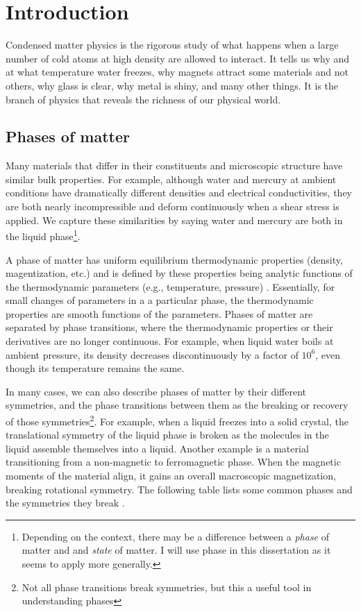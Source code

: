 \chapter{Introduction}
Condensed matter physics is the rigorous study of what happens when a large number of cold atoms at high density are allowed to interact. It tells us why and at what temperature water freezes, why magnets attract some materials and not others, why glass is clear, why metal is shiny, and many other things. It is the branch of physics that reveals the richness of our physical world.

\section{Phases of matter}
Many materials that differ in their constituents and microscopic structure have similar bulk properties. For example, although water and mercury at ambient conditions have dramatically different densities and electrical conductivities, they are both nearly incompressible and deform continuously when a shear stress is applied. We capture these similarities by saying water and mercury are both in the liquid phase\footnote{Depending on the context, there may be a difference between a \textit{phase} of matter and and \textit{state} of matter. I will use phase in this dissertation as it seems to apply more generally.}.

A phase of matter has uniform equilibrium thermodynamic properties (density, magentization, etc.) and is defined by these properties being analytic functions of the thermodynamic parameters (e.g., temperature, pressure) \cite{Pathria2011}. Essentially, for small changes of parameters in a a particular phase, the thermodynamic properties are smooth functions of the parameters. Phases of matter are separated by phase transitions, where the thermodynamic properties or their derivatives are no longer continuous. For example, when liquid water boils at ambient pressure, its density decreases discontinuously by a factor of $10^6$, even though its temperature remains the same.

In many cases, we can also describe phases of matter by their different symmetries, and the phase transitions between them as the breaking or recovery of those symmetries\footnote{Not all phase transitions break symmetries, but this a useful tool in understanding phases}. For example, when a liquid freezes into a solid crystal, the translational symmetry of the liquid phase is broken as the molecules in the liquid assemble themselves into a liquid. Another example is a material transitioning from a non-magnetic to ferromagnetic phase. When the magnetic moments of the material align, it gains an overall macroscopic magnetization, breaking rotational symmetry. The following table lists some common phases and the symmetries they break \cite{Chaikin1995}.

